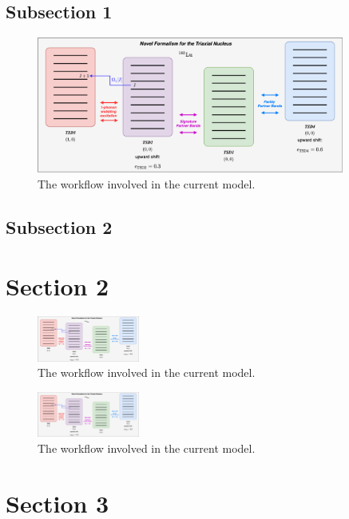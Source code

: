 \documentclass[%
 reprint,
 amsmath,
 amssymb,
 aps,
]{revtex4-2}
\begin{document}
\subsection{Subsection 1}

\lipsum[1-2]

\begin{figure}
    \centering
    \includegraphics[width=0.9\textwidth]{images/diagrams/double_shift_fit_workflow.png}
    \caption{The workflow involved in the current model.}
    \label{fig:parity-workflow}
\end{figure}

\lipsum[1-3]

\subsection{Subsection 2}

\lipsum[1-3]

\section{Section 2}

\lipsum[1-3]

\lipsum[1-3]

\begin{figure}
    \centering
    \includegraphics[width=0.3\textwidth]{images/diagrams/double_shift_fit_workflow.png}
    \caption{The workflow involved in the current model.}
    \label{fig:col-fig1}
\end{figure}

\lipsum[1-3]


\begin{figure}
    \centering
    \includegraphics[width=0.3\textwidth]{images/diagrams/double_shift_fit_workflow.png}
    \caption{The workflow involved in the current model.}
    \label{fig:col-fig2}
\end{figure}

\section{Section 3}

\lipsum[1-5]

\end{document}
